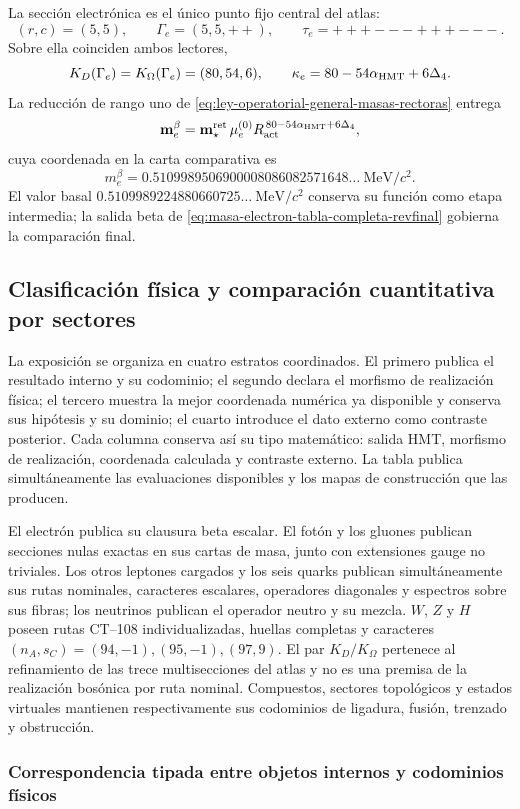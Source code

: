 La sección electrónica es el único punto fijo central del atlas:
\begin{equation}
 (r,c)=(5,5),\qquad
 \Gamma_e=(5,5,++),\qquad
 \tau_e=\mathtt{+++---+++---}.
 \label{eq:ruta-electronica-central-masas-rectoras}
\end{equation}
Sobre ella coinciden ambos lectores,
\begin{equation}
 K_D(\Gamma_e)=K_\Omega(\Gamma_e)=(80,54,6),\qquad
 \kappa_e=80-54\alpha_{\rm HMT}+6\Delta_4.
 \label{eq:kappa-electron-rector}
\end{equation}
La reducción de rango uno de
\eqref{eq:ley-operatorial-general-masas-rectoras} entrega
\begin{equation}
 \mathbf m_e^\beta
 =\mathbf m_\star^{\rm ret}\,
   \mu_e^{(0)}R_{\rm act}^{\,80-54\alpha_{\rm HMT}+6\Delta_4},
 \label{eq:electron-rank1-ley-masas}
\end{equation}
cuya coordenada en la carta comparativa es
\begin{equation}
 \boxed{m_e^\beta
 =0.5109989506900008086082571648\ldots\ \mathrm{MeV}/c^2.}
 \label{eq:masa-electron-tabla-completa-revfinal}
\end{equation}
El valor basal
\(0.5109989224880660725\ldots\ \mathrm{MeV}/c^2\) conserva su función como
etapa intermedia; la salida beta de
\eqref{eq:masa-electron-tabla-completa-revfinal} gobierna la comparación final.

\subsection{Clasificación física y comparación cuantitativa por sectores}

La exposición se organiza en cuatro estratos coordinados. El primero publica el
resultado interno y su codominio; el segundo declara el morfismo de realización
física; el tercero muestra la mejor coordenada numérica ya disponible y conserva
sus hipótesis y su dominio; el cuarto introduce el dato externo como contraste posterior.
Cada columna conserva así su tipo matemático: salida HMT, morfismo de
realización, coordenada calculada y contraste externo. La tabla publica
simultáneamente las evaluaciones disponibles y los mapas de construcción que las
producen.

El electrón publica su clausura beta escalar. El fotón y los gluones publican
secciones nulas exactas en sus cartas de masa, junto con extensiones gauge no
triviales. Los otros leptones cargados y los seis quarks publican simultáneamente
sus rutas nominales, caracteres escalares, operadores diagonales y espectros sobre
sus fibras; los neutrinos publican el operador neutro y su mezcla. \(W\), \(Z\) y
\(H\) poseen rutas CT--108 individualizadas, huellas completas y caracteres
\((n_A,s_C)=(94,-1),(95,-1),(97,9)\). El par \(K_D/K_\Omega\) pertenece al
refinamiento de las trece multisecciones del atlas y no es una premisa de la
realización bosónica por ruta nominal. Compuestos, sectores topológicos y estados
virtuales mantienen respectivamente sus codominios de ligadura, fusión, trenzado
y obstrucción.

\subsubsection{Correspondencia tipada entre objetos internos y codominios físicos}

